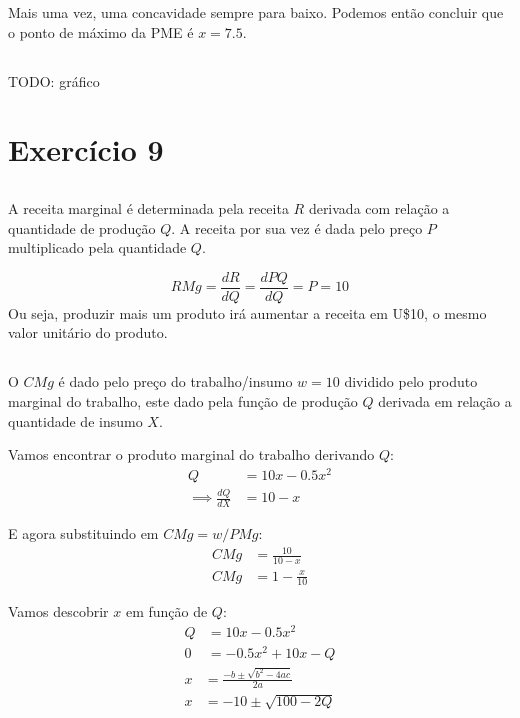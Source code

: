 \documentclass{article}
\begin{document}
Mais uma vez, uma concavidade sempre para baixo. Podemos então concluir que o
ponto de máximo da PME é \(x=7.5\).

\subsection{}

TODO: gráfico

\section{Exercício 9}
\subsection{}

A receita marginal é determinada pela receita \(R\) derivada com relação a
quantidade de produção \(Q\). A receita por sua vez é dada pelo preço \(P\)
multiplicado pela quantidade \(Q\).

\[
	RMg = \frac{dR}{dQ} = \frac{dPQ}{dQ} = P = 10
\]
Ou seja, produzir mais um produto irá aumentar a receita em U\$10, o mesmo
valor unitário do produto.

\subsection{}

O \(CMg\) é dado pelo preço do trabalho/insumo \(w = 10\) dividido pelo produto
marginal do trabalho, este dado pela função de produção \(Q\) derivada em
relação a quantidade de insumo \(X\).

Vamos encontrar o produto marginal do trabalho derivando \(Q\):
\[
	\begin{aligned}
		Q                      & = 10x - 0.5x^2 \\
		\implies \frac{dQ}{dX} & = 10 - x
	\end{aligned}
\]

E agora substituindo em \(CMg = w/PMg\):
\[
	\begin{aligned}
		CMg & = \frac{10}{10 - x} \\
		CMg & = 1 - \frac{x}{10}
	\end{aligned}
\]

Vamos descobrir \(x\) em função de \(Q\):
\[
	\begin{aligned}
		Q & = 10x - 0.5x^2 \\
        0 & = - 0.5x^2 + 10x - Q
	\end{aligned}
\]
\[
	\begin{aligned}
        x & = \frac{-b\pm \sqrt{b^2 - 4ac}}{2a} \\
        x & = -10 \pm \sqrt{100 - 2Q}
	\end{aligned}
\]
\end{document}
